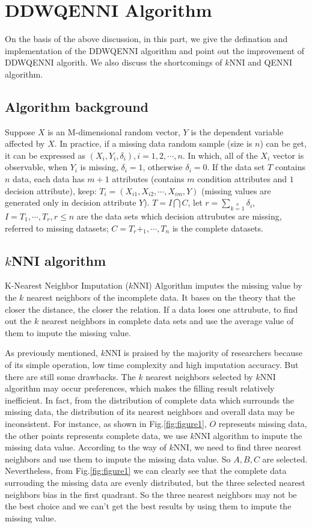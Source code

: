 \documentclass[print]{jicspack}
\begin{document}
\section{DDWQENNI Algorithm}
\label{sec:2.1}
On the basis of the above discussion, in this part, we give the defination and implementation of the DDWQENNI algorithm and point out the improvement of DDWQENNI algorith. We also discuss the shortcomings of $k$NNI and QENNI algorithm.
\subsection{Algorithm background}
Suppose $X$ is an M-dimensional random vector, $Y$ is the dependent variable affected by $X$. In practice, if a missing data random sample (size is $n$) can be get, it can be expressed as $(X_i, Y_i, \delta_i), i= 1, 2,\cdots, n$. In which, all of the $X_i$ vector is observable, when $Y_i$ is missing, $\delta_i = 1$, otherwise $\delta_i = 0$. If the data set $T$ contains $n$ data, each data has $m + 1$ attributes (contains $m$ condition attributes and $1$ decision attribute), keep: $T_i = (X_{i1}, X_{i2}, \cdots, X_{im}, Y)$ (missing values are generated only in decision attribute $Y$). $T = I \bigcap C$, let $r = \sum\limits_{k=1}\limits^{n} \delta_i$, $I = {T_1, \cdots, T_r}, r \leq n$ are the data sets which decision attrubutes are missing, referred to missing datasets; $C = {T_r+_1, \cdots, T_n}$ is the complete datasets.
\subsection{$k$NNI algorithm}
\label{2.2}
K-Nearest Neighbor Imputation ($k$NNI) Algorithm imputes the missing value by the $k$ nearest neighbors of the incomplete data. It bases on the theory that the closer the distance, the closer the relation. If a data loses one attrubute, to find out the $k$ nearest neighbors in complete data sets and use the average value of them to impute the missing value.

As previously mentioned, $k$NNI is praised by the majority of researchers because of its simple operation, low time complexity and high imputation accuracy. But there are still some drawbacks. The $k$ nearest neighbors selected by $k$NNI algorithm may occur preferences, which makes the filling result relatively inefficient. In fact, from the distribution of complete data which surrounds the missing data, the distribution of its nearest neighbors and overall data may be inconsistent. For instance, as shown in Fig.\ref{fig:figure1}, $O$ represents missing data, the other points represents complete data, we use $k$NNI algorithm to impute the missing data value. According to the way of $k$NNI, we need to find three nearest neighbors and use them to impute the missing data value. So $A, B, C$ are selected. Nevertheless, from Fig.\ref{fig:figure1} we can clearly see that the complete data surrouding the missing data are evenly distributed, but the three selected nearest neighbors bias in the first quadrant. So the three nearest neighbors may not be the best choice and we can't get the best results by using them to impute the missing value.
\end{document}
